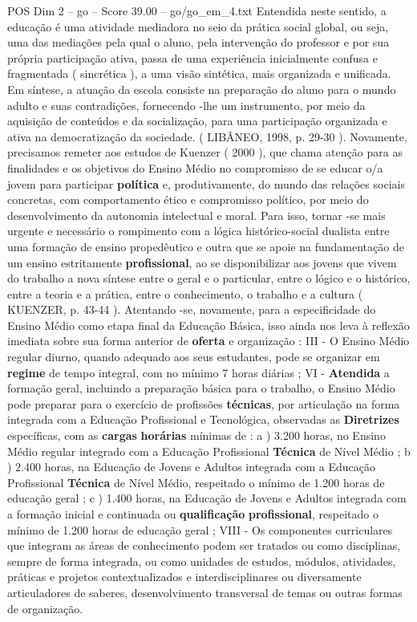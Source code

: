 \begin{textsample}{POS Dim 2 – go – Score 39.00 – go/go\_em\_4.txt}
Entendida neste sentido, a educação é uma atividade mediadora no seio da prática social global, ou seja, uma das mediações pela qual o aluno, pela intervenção do professor e por sua própria participação ativa, passa de uma experiência inicialmente confusa e fragmentada ( sincrética ), a uma visão sintética, mais organizada e unificada.
Em síntese, a atuação da escola consiste na preparação do aluno para o mundo adulto e suas contradições, fornecendo -lhe um instrumento, por meio da aquisição de conteúdos e da socialização, para uma participação organizada e ativa na democratização da sociedade. ( LIBÂNEO, 1998, p. 29-30 ).
Novamente, precisamos remeter aos estudos de Kuenzer ( 2000 ), que chama atenção para as finalidades e os objetivos do Ensino Médio no compromisso de se educar o/a jovem para participar \textbf{política} e, produtivamente, do mundo das relações sociais concretas, com comportamento ético e compromisso político, por meio do desenvolvimento da autonomia intelectual e moral.
Para isso, tornar -se mais urgente e necessário o rompimento com a lógica histórico-social dualista entre uma formação de ensino propedêutico e outra que se apoie na fundamentação de um ensino estritamente \textbf{profissional}, ao se disponibilizar aos jovens que vivem do trabalho a nova síntese entre o geral e o particular, entre o lógico e o histórico, entre a teoria e a prática, entre o conhecimento, o trabalho e a cultura ( KUENZER, p. 43-44 ).
Atentando -se, novamente, para a especificidade do Ensino Médio como etapa final da Educação Básica, isso ainda nos leva à reflexão imediata sobre sua forma anterior de \textbf{oferta} e organização : III - O Ensino Médio regular diurno, quando adequado aos seus estudantes, pode se organizar em \textbf{regime} de tempo integral, com no mínimo 7 horas diárias ; VI - \textbf{Atendida} a formação geral, incluindo a preparação básica para o trabalho, o Ensino Médio pode preparar para o exercício de profissões \textbf{técnicas}, por articulação na forma integrada com a Educação Profissional e Tecnológica, observadas as \textbf{Diretrizes} específicas, com as \textbf{cargas} \textbf{horárias} mínimas de : a ) 3.200 horas, no Ensino Médio regular integrado com a Educação Profissional \textbf{Técnica} de Nível Médio ; b ) 2.400 horas, na Educação de Jovens e Adultos integrada com a Educação Profissional \textbf{Técnica} de Nível Médio, respeitado o mínimo de 1.200 horas de educação geral ; c ) 1.400 horas, na Educação de Jovens e Adultos integrada com a formação inicial e continuada ou \textbf{qualificação} \textbf{profissional}, respeitado o mínimo de 1.200 horas de educação geral ; VIII - Os componentes curriculares que integram as áreas de conhecimento podem ser tratados ou como disciplinas, sempre de forma integrada, ou como unidades de estudos, módulos, atividades, práticas e projetos contextualizados e interdisciplinares ou diversamente articuladores de saberes, desenvolvimento transversal de temas ou outras formas de organização.

\end{textsample}
